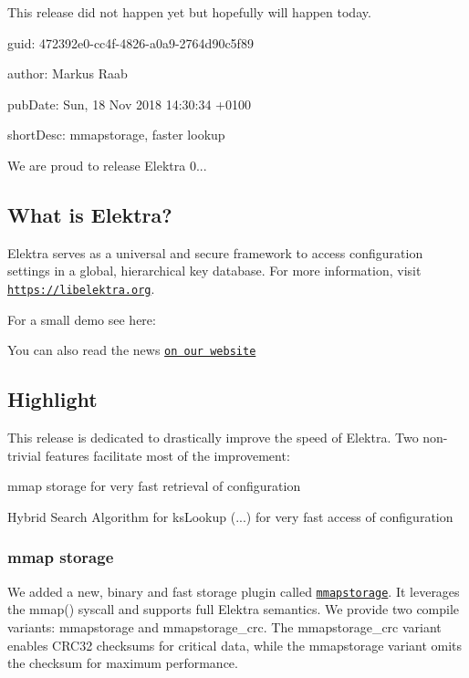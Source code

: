 This release did not happen yet but hopefully will happen today.


\begin{DoxyItemize}
\item guid\+: 472392e0-\/cc4f-\/4826-\/a0a9-\/2764d90c5f89
\item author\+: Markus Raab
\item pub\+Date\+: Sun, 18 Nov 2018 14\+:30\+:34 +0100
\item short\+Desc\+: mmapstorage, faster lookup
\end{DoxyItemize}

We are proud to release Elektra 0...

\subsection*{What is Elektra?}

Elektra serves as a universal and secure framework to access configuration settings in a global, hierarchical key database. For more information, visit \href{https://libelektra.org}{\tt https\+://libelektra.\+org}.

For a small demo see here\+:

\href{https://asciinema.org/a/cantr04assr4jkv8v34uz9b8r}{\tt }

You can also read the news \href{https://www.libelektra.org/news/0.8.25-release}{\tt on our website}

\subsection*{Highlight}

This release is dedicated to drastically improve the speed of Elektra. Two non-\/trivial features facilitate most of the improvement\+:


\begin{DoxyItemize}
\item mmap storage for very fast retrieval of configuration
\item Hybrid Search Algorithm for {\ttfamily ks\+Lookup (...)} for very fast access of configuration
\end{DoxyItemize}

\subsubsection*{mmap storage}

We added a new, binary and fast storage plugin called \href{https://libelektra.org/plugins/mmapstorage}{\tt {\ttfamily mmapstorage}}. It leverages the {\ttfamily mmap()} syscall and supports full Elektra semantics. We provide two compile variants\+: {\ttfamily mmapstorage} and {\ttfamily mmapstorage\+\_\+crc}. The {\ttfamily mmapstorage\+\_\+crc} variant enables C\+R\+C32 checksums for critical data, while the {\ttfamily mmapstorage} variant omits the checksum for maximum performance.

